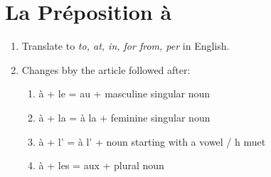 \documentclass{book}
\begin{document}
    \section{La Préposition à} 
        \begin{enumerate}
            \item Translate to \textit{to, at, in, for from, per} in English.
            \item Changes bby the article followed after:
                \begin{enumerate}
                    \item à + le = au + masculine singular noun
                    \item à + la = à la + feminine singular noun
                    \item à + l' = à l' + noun starting with a vowel / h muet
                    \item à + les = aux + plural noun
                \end{enumerate}
        \end{enumerate}
    
\end{document}
